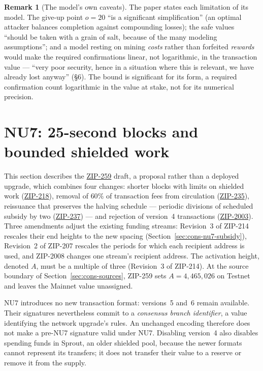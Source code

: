 \documentclass[11pt,a4paper]{article}
\theoremstyle{definition}
\newtheorem{remark}[theorem]{Remark}
\renewcommand{\sectionmark}[1]{\markboth{\thesection\ \ #1}{}}
\begin{document}
\begin{remark}[The model's own caveats]\label{rem:cons-econcaveats}
The paper states each limitation of its model. The give-up point $o = 20$
``is a significant simplification'' (an optimal attacker balances
completion against compounding losses); the safe values ``should be
taken with a grain of salt, because of the many modeling
assumptions''; and a model resting on mining \emph{costs} rather than
forfeited \emph{rewards} would make the required confirmations linear,
not logarithmic, in the transaction value --- ``very poor security,
hence in a situation where this is relevant, we have already lost
anyway'' (\S6). The bound is significant for its form, a required
confirmation count logarithmic in the value at stake, not for its
numerical precision.
\end{remark}

\FloatBarrier

\section{NU7: 25-second blocks and bounded shielded work}
\label{sec:cons-deployed}\label{sec:cons-nu7}
\sectionmark{NU7: 25-second blocks}

This section describes the \href{https://zips.z.cash/zip-0259}{ZIP-259}
draft, a proposal rather than a deployed upgrade, which combines four
changes: shorter blocks with limits on shielded work
(\href{https://zips.z.cash/zip-0218}{ZIP-218}), removal of $60\%$ of
transaction fees from circulation
(\href{https://zips.z.cash/zip-0235}{ZIP-235}), reissuance that preserves the
halving schedule --- periodic divisions of scheduled subsidy by two
(\href{https://zips.z.cash/zip-0237}{ZIP-237}) ---
and rejection of version~4 transactions
(\href{https://zips.z.cash/zip-2003}{ZIP-2003}). Three amendments adjust the
existing funding streams: Revision~3 of ZIP-214 rescales their end heights
to the new spacing (Section~\ref{sec:cons-nu7-subsidy}), Revision~2 of
ZIP-207 rescales the periods for which each recipient address is used, and
ZIP-2008 changes one stream's recipient address. The activation height,
denoted $A$, must be a multiple of three (Revision~3 of ZIP-214). At the
source boundary of Section~\ref{sec:cons-sources}, ZIP-259 sets
$A=4{,}465{,}026$ on Testnet and leaves the Mainnet value unassigned.

NU7 introduces no new transaction format: versions~5 and~6 remain available.
Their signatures nevertheless commit to a \emph{consensus branch identifier},
a value identifying the network upgrade's rules. An unchanged encoding
therefore does not make a pre-NU7 signature valid under NU7.
Disabling version~4 also disables spending funds in Sprout, an older
shielded pool, because the newer formats cannot represent its transfers;
it does not transfer their value to a reserve or remove it from the supply.
\end{document}
